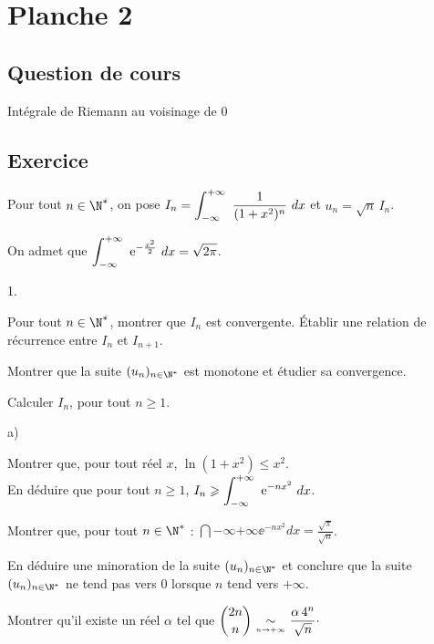 \documentclass[11pt]{article}%
\begin{document}
\newpage


\section*{Planche 2}

\subsection*{Question de cours}

\noindent
Intégrale de Riemann au voisinage de $0$


\subsection*{Exercice}

\noindent
Pour tout $n\in\N^*$, on pose 
$I_n=\displaystyle \int_{-\infty}^{+\infty}\ \frac{1}{(1+x^2)^n} \ dx$ et 
$u_n=\sqrt{n}\,I_n$.

On admet que 
$\displaystyle \int_{-\infty}^{+\infty}\ \text{e}^{-\frac{x^2}{2}}\ dx=\sqrt{2\pi}$.
\begin{noliste}{1.}
\item Pour tout $n\in\N^*$, montrer que $I_n$ est convergente. 
\'Etablir une relation de récurrence entre $I_n$ et $I_{n+1}$.

\item Montrer que la suite $(u_n)_{n\in\N^*}$ est monotone et étudier 
sa convergence.

\item Calculer $I_n$, pour tout $n\geq 1$.

\item \begin{noliste}{a)}
	\item Montrer que, pour tout réel $x$, $\ln(1+x^2)\leq x^2$.\\ En 
déduire que pour tout $n\geq 1$, $I_n\geqslant 
\displaystyle \int_{-\infty}^{+\infty}\ \text{e}^{-nx^2}\ dx$.		
	
	\item Montrer que, pour tout $n\in\N^*$ : 
$\dint{-\infty}{+\infty}\ee^{-n x^2}dx=\frac{\sqrt\pi}{\sqrt{n}}$.
	
	\item En déduire une minoration de la suite $(u_n)_{n\in\N^*}$ 
et conclure que la suite $(u_n)_{n\in\N^*}$ ne tend pas vers $0$ 
lorsque $n$ tend vers $+\infty$.
	
	\end{noliste}
\item Montrer qu'il existe un réel $\alpha$ tel que $\dbinom{2n}{n} 
{\ \underset {{\overset {n \to +\infty}{}}}{\sim}\ }\dfrac{\alpha\,4^n}{\sqrt{n}}\cdot$
\end{noliste}
\end{document}
